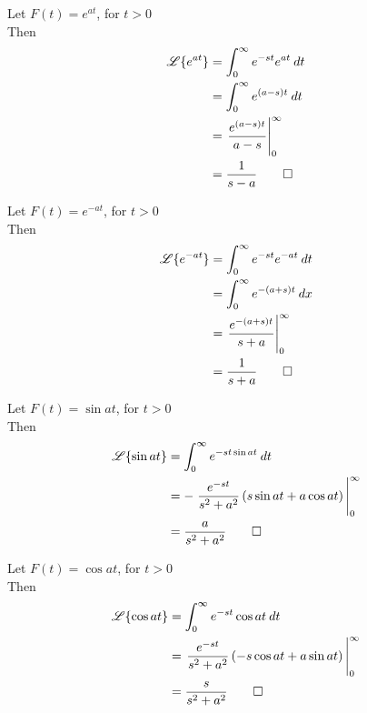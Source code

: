 \documentclass[12pt]{article}
\newcommand{\Lap}{\mathscr{L}}
\begin{document}
\begin{multicols}{2}
    Let $F(t) = e^{at}$, for $t>0$\\
    Then\\
    \begin{align*}
        \Lap \{ e^{at} \} &= \int_{0}^{\infty} { e^{-s t} e^{at} } \: d{t} \\
                          &= \int_{0}^{\infty} { e^{(a-s)t} } \: d{t} \\
                          &= \eval{ \frac{e^{(a-s)t}}{a-s} }_{0}^{\infty} \\
                          &= \frac{1}{s-a}\qed
    \end{align*}
    \columnbreak
    
    Let $F(t)=e^{-at}$, for $t>0$ \\
    Then\\
    \begin{align*}
        \Lap \{ e^{-at} \} &= \int_{0}^{\infty} {e^{-s t} e^{-at}} \: d{t} \\
        &= \int_{0}^{\infty} {e^{-(a+s)t}} \: d{x} \\
        &= \eval{ \frac{e^{-(a+s)t}}{s+a} }_{0}^{\infty} \\
        &= \frac{1}{s+a}\qed
    \end{align*}
\end{multicols}

\newpage
\begin{multicols}{2}
    Let $F(t) = \sin{at}$, for $t>0$ \\
    Then\\
    \begin{align*}
        \Lap \{ \sin{at} \} &= \int_{0}^{\infty} { e^{-s t \sin{at}} } \: d{t} \\
        &= - \eval{ \frac{e^{-s t}}{s^2+a^2} \left( s\sin{at} + a\cos{at} \right) }_{0}^{\infty} \\
        &= \frac{a}{s^2+a^2}\qed
    \end{align*}
    \columnbreak
    
    Let $F(t) = \cos{at}$, for $t>0$ \\
    Then\\
    \begin{align*}
        \Lap \{ \cos{at} \} &= \int_{0}^{\infty} { e^{-s t}\cos{at} } \: d{t} \\
        &= \eval{ \frac{e^{-s t}}{s^2+a^2} \left( -s\cos{at} + a\sin{at} \right) }_{0}^{\infty} \\
        &= \frac{s}{s^2+a^2}\qed
    \end{align*}
\end{multicols}
\end{document}
